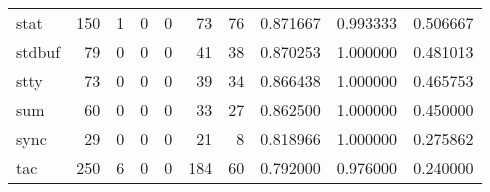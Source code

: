\begin{longtable}{lrrrrrrrrr}
stat      &                                       150 &                                                  1 &                                                  0 &                                                  0 &                                                 73 &                                                 76 &                                           0.871667 &                               0.993333 &                             0.506667 \\
stdbuf    &                                        79 &                                                  0 &                                                  0 &                                                  0 &                                                 41 &                                                 38 &                                           0.870253 &                               1.000000 &                             0.481013 \\
stty      &                                        73 &                                                  0 &                                                  0 &                                                  0 &                                                 39 &                                                 34 &                                           0.866438 &                               1.000000 &                             0.465753 \\
sum       &                                        60 &                                                  0 &                                                  0 &                                                  0 &                                                 33 &                                                 27 &                                           0.862500 &                               1.000000 &                             0.450000 \\
sync      &                                        29 &                                                  0 &                                                  0 &                                                  0 &                                                 21 &                                                  8 &                                           0.818966 &                               1.000000 &                             0.275862 \\
tac       &                                       250 &                                                  6 &                                                  0 &                                                  0 &                                                184 &                                                 60 &                                           0.792000 &                               0.976000 &                             0.240000 \\

\end{longtable}
